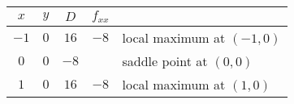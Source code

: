 \documentclass[runningheads]{llncs}
\begin{document}
\begin{tabular}{cc|cc|l}
	$x$ & $y$ & $D$ & $f_{xx}$ & \\
	\hline
	$-1$ & $0$ & $16$ & $-8$ & local maximum at $\left(-1, 0\right)$ \\
	$0$ & $0$ & $-8$ &  & saddle point at $\left(0, 0\right)$ \\
	$1$ & $0$ & $16$ & $-8$ & local maximum at $\left(1, 0\right)$
\end{tabular}
\end{document}
